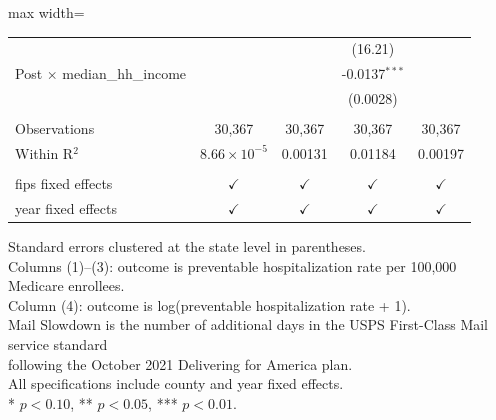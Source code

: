 \begin{table}[htbp]
\begin{adjustbox}{max width=\textwidth}
\begin{tabular}{lcccc}
                                                           &                       &                & (16.21)         &   \\   
      Post $\times$ median\_hh\_income                     &                       &                & -0.0137$^{***}$ &   \\   
                                                           &                       &                & (0.0028)        &   \\   
       \\
      Observations                                         & 30,367                & 30,367         & 30,367          & 30,367\\  
      Within R$^2$                                         & $8.66\times 10^{-5}$  & 0.00131        & 0.01184         & 0.00197\\  
       \\
      fips fixed effects                                   & $\checkmark$          & $\checkmark$   & $\checkmark$    & $\checkmark$\\   
      year fixed effects                                   & $\checkmark$          & $\checkmark$   & $\checkmark$    & $\checkmark$\\   
      \bottomrule
   \end{tabular}
   \end{adjustbox}

   \par \raggedright 
   Standard errors clustered at the state level in parentheses.\\
   Columns (1)--(3): outcome is preventable hospitalization rate per 100,000 Medicare enrollees.\\
   Column (4): outcome is log(preventable hospitalization rate + 1).\\
   Mail Slowdown is the number of additional days in the USPS First-Class Mail service standard\\
   following the October 2021 Delivering for America plan.\\
   All specifications include county and year fixed effects.\\
   * $p<0.10$, ** $p<0.05$, *** $p<0.01$.
\end{table}


